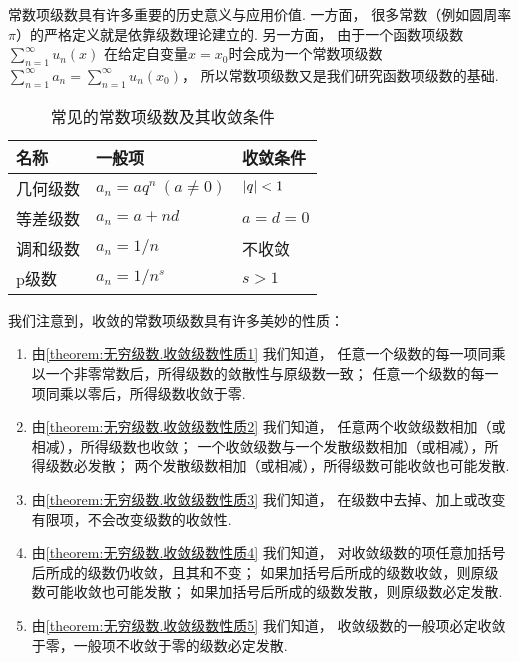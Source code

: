 常数项级数具有许多重要的历史意义与应用价值.
一方面，
很多常数（例如圆周率\(\pi\)）的严格定义就是依靠级数理论建立的.
另一方面，
由于一个函数项级数\(\sum\limits_{n=1}^\infty u_n(x)\)%
在给定自变量\(x=x_0\)时会成为一个常数项级数\(\sum\limits_{n=1}^\infty a_n
= \sum\limits_{n=1}^\infty u_n(x_0)\)，
所以常数项级数又是我们研究函数项级数的基础.

\begin{table}[h]
	\centering
	\begin{tabular}{*3l}
		\hline
		名称 & 一般项 & 收敛条件 \\ \hline
		几何级数 & \(a_n = a q^n\ (a\neq0)\) & \(\abs{q}<1\) \\
		等差级数 & \(a_n = a + n d\) & \(a = d = 0\) \\
		调和级数 & \(a_n = 1/n\) & 不收敛 \\
		p级数 & \(a_n = 1/n^s\) & \(s > 1\) \\
		\hline
	\end{tabular}
	\caption{常见的常数项级数及其收敛条件}
\end{table}

我们注意到，收敛的常数项级数具有许多美妙的性质：
\begin{enumerate}
\item 由\cref{theorem:无穷级数.收敛级数性质1} 我们知道，
任意一个级数的每一项同乘以一个非零常数后，所得级数的敛散性与原级数一致；
任意一个级数的每一项同乘以零后，所得级数收敛于零.

\item 由\cref{theorem:无穷级数.收敛级数性质2} 我们知道，
任意两个收敛级数相加（或相减），所得级数也收敛；
一个收敛级数与一个发散级数相加（或相减），所得级数必发散；
两个发散级数相加（或相减），所得级数可能收敛也可能发散.

\item 由\cref{theorem:无穷级数.收敛级数性质3} 我们知道，
在级数中去掉、加上或改变有限项，不会改变级数的收敛性.

\item 由\cref{theorem:无穷级数.收敛级数性质4} 我们知道，
对收敛级数的项任意加括号后所成的级数仍收敛，且其和不变；
如果加括号后所成的级数收敛，则原级数可能收敛也可能发散；
如果加括号后所成的级数发散，则原级数必定发散.

\item 由\cref{theorem:无穷级数.收敛级数性质5} 我们知道，
收敛级数的一般项必定收敛于零，一般项不收敛于零的级数必定发散.
\end{enumerate}


